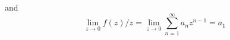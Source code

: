 \documentclass{homework}
\begin{document}
\begin{solution}
                                                                                                                                                                                                                                                                  and 
                                                                                                                                                                                                                                                                  \[
                                                                                                                                                                                                                                                                  \lim_{z\to 0} f(z)/z = \lim_{z\to 0} \sum_{n=1}^\infty a_nz^{n-1} = a_1 
                                                                                                                                                                                                                                                                  \]


\end{solution}
\end{document}
